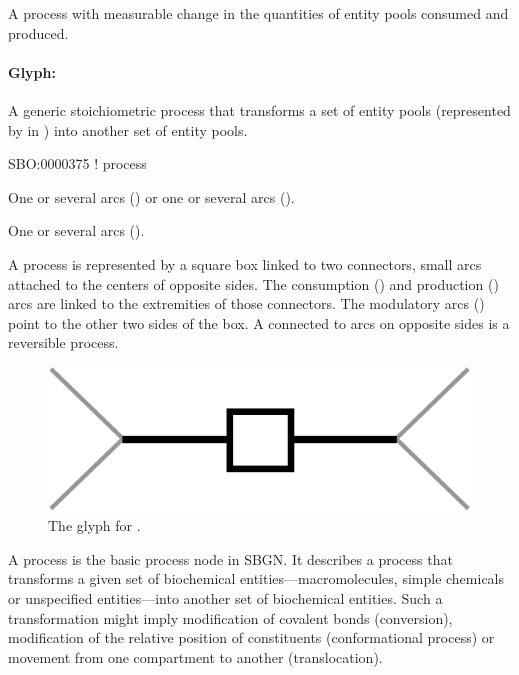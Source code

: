 A process with measurable change in the quantities of entity pools
consumed and produced. 



\paragraph{Glyph: }
\label{sec:process}

A generic stoichiometric process that transforms a set of entity pools (represented by  in \SBGNPDLone) into another set of entity pools.

\begin{glyphDescription}

\glyphSboTerm SBO:0000375 ! process

\glyphOrigin One or several  arcs () or one or several  arcs ().

\glyphTarget One or several  arcs ().

\glyphNode A process is represented by a square box linked to two connectors, small arcs attached to the centers of opposite sides. The consumption () and production () arcs are linked to the extremities of those connectors. The modulatory arcs () point to the other two sides of the box. A  connected to  arcs on opposite sides is a reversible process. 

\end{glyphDescription}

\begin{figure}[H]
  \centering
  \includegraphics[scale = 0.4]{images/process}
  \caption{The \PD glyph for .}
  \label{fig:process}
\end{figure}

A process is the basic process node in SBGN.  It describes a process that transforms a given set of biochemical entities---macromolecules, simple chemicals or unspecified entities---into another set of biochemical entities.  Such a transformation might imply modification of covalent bonds (conversion), modification of the relative position of constituents (conformational process) or movement from one compartment to another (translocation).


